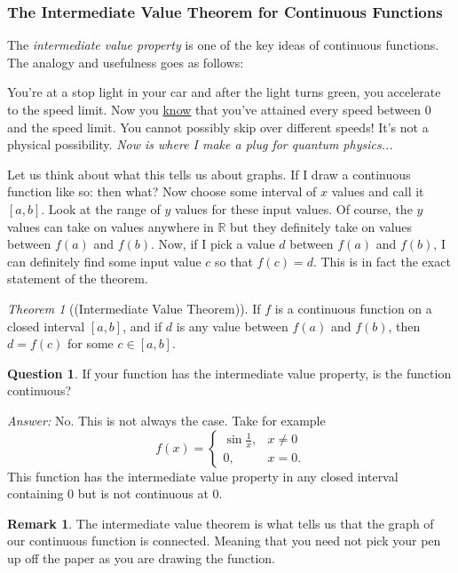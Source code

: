 \documentclass[leqno]{article}
\theoremstyle{definition}
\newtheorem{remark}{Remark}[section]
\newtheorem{question}{Question}[section]
\theoremstyle{remark}
\theoremstyle{theorem}
\newtheorem{theorem}{Theorem}[section]
\newcommand{\R}{\mathbb{R}}
\begin{document}
\subsubsection{The Intermediate Value Theorem for Continuous Functions}

The \emph{intermediate value property} is one of the key ideas of continuous functions.  The analogy and usefulness goes as follows:

You're at a stop light in your car and after the light turns green, you accelerate to the speed limit.  Now you \underline{know} that you've attained every speed between 0 and the speed limit.   You cannot possibly skip over different speeds!  It's not a physical possibility. \emph{Now is where I make a plug for quantum physics...}

Let us think about what this tells us about graphs. If I draw a continuous function like so:
\vspace*{6cm}
then what? Now choose some interval of $x$ values and call it $[a,b]$.  Look at the range of $y$ values for these input values. Of course, the $y$ values can take on values anywhere in $\R$ but they definitely take on values between $f(a)$ and $f(b)$.  Now, if I pick a value $d$ between $f(a)$ and $f(b)$, I can definitely find some input value $c$ so that $f(c)=d$. This is in fact the exact statement of the theorem.

\begin{theorem}[(Intermediate Value Theorem)]
If $f$ is a continuous function on a closed interval $[a,b]$, and if $d$ is any value between $f(a)$ and $f(b)$, then $d=f(c)$ for some $c\in [a,b]$.
\end{theorem} 

\begin{question}
If your function has the intermediate value property, is the function continuous?

\noindent\emph{Answer:} No. This is not always the case.  Take for example 
\[
f(x)=
\begin{cases}
\sin \frac{1}{x}, &x\neq 0 \\
0, & x=0.
\end{cases}
\]
This function has the intermediate value property in any closed interval containing $0$ but is not continuous at $0$.
\end{question}

\begin{remark}
The intermediate value theorem is what tells us that the graph of our continuous function is connected.  Meaning that you need not pick your pen up off the paper as you are drawing the function.
\end{remark}
\end{document}
